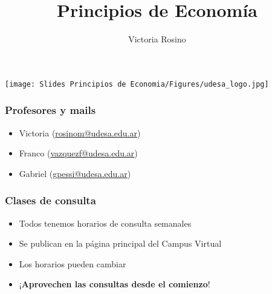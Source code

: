 \documentclass{beamer}
\title[Principios de Economía]{Principios de Economía \vspace{4mm}
\\ }
\date{}
\author[Victoria Rosino]{Victoria Rosino}
\institute[]{Universidad de San Andrés}
\begin{document}
\begin{frame}
    \vspace{0.4cm}
    \titlepage
    \centering
    \vspace{-0.5cm}
    \texttt{[image: Slides Principios de Economia/Figures/udesa\_logo.jpg]} 
\end{frame}

\begin{frame}
    \frametitle{Profesores y mails}
    \begin{itemize}
        \item Victoria (\href{mailto:rosinom@udesa.edu.ar}{rosinom@udesa.edu.ar}) \vspace{2mm}
        \item Franco (\href{mailto:vazquezf@udesa.edu.ar} {vazquezf@udesa.edu.ar}) \vspace{2mm}
        \item Gabriel (\href{mailto:gpessi@udesa.edu.ar} {gpessi@udesa.edu.ar}) 
    \end{itemize}
\end{frame}

\begin{frame}
    \frametitle{Clases de consulta}
    \begin{itemize}
        \item Todos tenemos horarios de consulta semanales \vspace{2mm}
        \item Se publican en la página principal del Campus Virtual \vspace{2mm}
        \item Los horarios pueden cambiar \vspace{2mm}
        \item ¡\textbf{Aprovechen las consultas desde el comienzo}!
    \end{itemize}
\end{frame}
\end{document}
